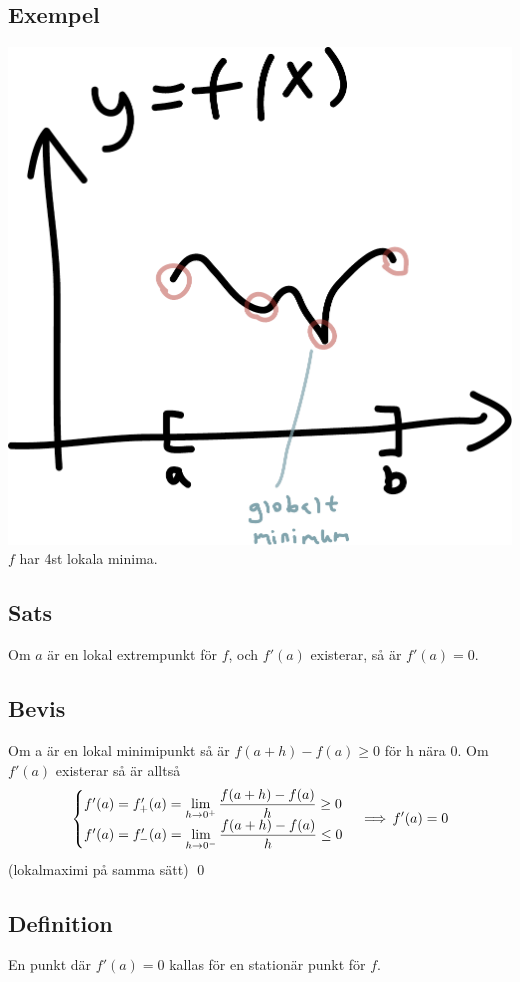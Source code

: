 \documentclass{article}
\begin{document}
\subsection{Exempel}
\includegraphics[scale=0.4]{img/graph1.pdf}\\
$f$ har 4st lokala minima.

\subsection{Sats}
Om $a$ är en lokal extrempunkt för $f$, och $f'(a)$ existerar, så är $f'(a)=0$.

\subsection{Bevis}
Om a är en lokal minimipunkt så är $f(a+h)-f(a)\ge 0$ för h nära 0.
Om $f'(a)$ existerar så är alltså
$$
\begin{cases}
f'(a) = f'_+(a)=\displaystyle \lim_{h \rightarrow 0^+} \frac{f(a+h)-f(a)}{h} \ge 0\\
f'(a) = f'_-(a)=\displaystyle \lim_{h \rightarrow 0^-} \frac{f(a+h)-f(a)}{h} \le 0
\end{cases}
\operatorname{\implies} f'(a) = 0
$$
(lokalmaximi på samma sätt)
\qed

\subsection{Definition}
En punkt där $f'(a) = 0$ kallas för en stationär punkt för $f$.
\end{document}

